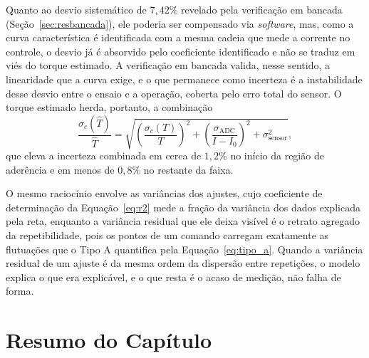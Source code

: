 Quanto ao desvio sistemático de $7{,}42\%$ revelado pela verificação em bancada
(Seção~\ref{sec:resbancada}), ele poderia ser compensado via \emph{software}, mas, como a
curva característica é identificada com a mesma cadeia que mede a corrente no controle, o
desvio já é absorvido pelo coeficiente identificado e não se traduz em viés do torque
estimado. A verificação em bancada valida, nesse sentido, a linearidade que a curva exige,
e o que permanece como incerteza é a instabilidade desse desvio entre o ensaio e a
operação, coberta pelo erro total do sensor. O torque estimado herda, portanto, a
combinação
\begin{equation}\label{eq:propagacao_estimador}
\frac{\sigma_c(\hat{T})}{\hat{T}} = \sqrt{\left(\frac{\sigma_c(T)}{T}\right)^2
                        + \left(\frac{\sigma_{\mathrm{ADC}}}{I - I_0}\right)^2
                        + \sigma_{\mathrm{sensor}}^2},
\end{equation}
que eleva a incerteza combinada em cerca de $1{,}2\%$ no início da região de aderência e em
menos de $0{,}8\%$ no restante da faixa.

O mesmo raciocínio envolve as variâncias dos ajustes, cujo coeficiente de determinação da
Equação~\eqref{eq:r2} mede a fração da variância dos dados explicada pela reta, enquanto a
variância residual que ele deixa visível é o retrato agregado da repetibilidade, pois os
pontos de um comando carregam exatamente as flutuações que o Tipo A quantifica pela
Equação~\eqref{eq:tipo_a}. Quando a variância residual de um ajuste é da mesma ordem da
dispersão entre repetições, o modelo explica o que era explicável, e o que resta é o
acaso de medição, não falha de forma.

\section{Resumo do Capítulo}


